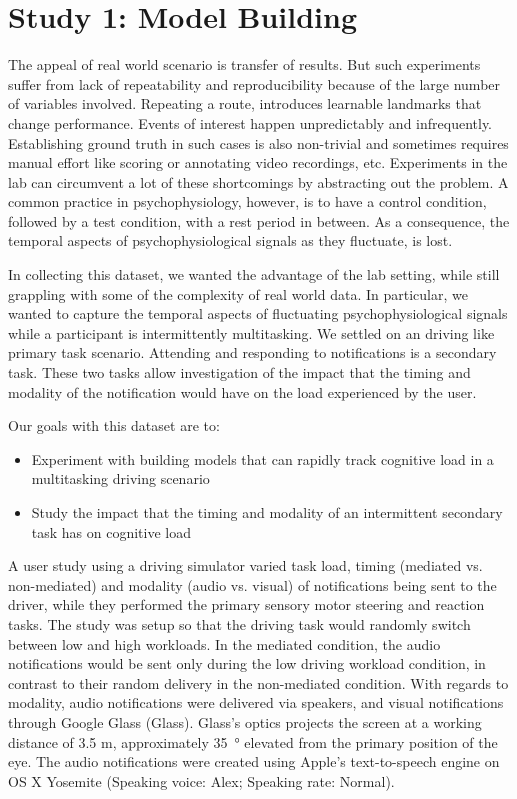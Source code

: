 \section{Study 1: Model Building}
The appeal of real world scenario is transfer of results. But such experiments suffer from lack of repeatability and reproducibility because of the large number of variables involved. Repeating a route, introduces learnable landmarks that change performance.  Events of interest happen unpredictably and infrequently. Establishing ground truth in such cases is also non-trivial and sometimes requires manual effort like scoring or annotating video recordings, etc. Experiments in the lab can circumvent a lot of these shortcomings by abstracting out the problem. A common practice in psychophysiology, however, is to have a control condition, followed by a test condition, with a rest period in between. As a consequence, the temporal aspects of psychophysiological signals as they fluctuate, is lost. 


In collecting this dataset, we wanted the advantage of the lab setting, while still grappling with some of the complexity of real world data. In particular, we wanted to capture the temporal aspects of fluctuating psychophysiological signals while a participant is intermittently multitasking. We settled on an driving like primary task scenario. Attending and responding to notifications is a  secondary task. These two tasks allow investigation of the impact that the timing and modality of the notification would have on the load experienced by the user. 

Our goals with this dataset are to:
\begin{itemize}
\item Experiment with building models that can rapidly track cognitive load in a multitasking driving scenario
\item Study the impact that the timing and modality of an intermittent secondary task has on cognitive load
\end{itemize}

A user study using a driving simulator varied task load,  timing (mediated vs. non-mediated) and modality (audio vs. visual) of notifications being sent to the driver, while they performed the primary sensory motor steering and reaction tasks. The study was setup so that the driving task would randomly switch between low and high workloads. In the mediated condition, the audio notifications would be sent only during the low driving workload condition, in contrast to their random delivery in the non-mediated condition. With regards to modality, audio notifications were delivered via speakers, and visual notifications through Google Glass (Glass). Glass's optics projects the screen at a working distance of 3.5 m, approximately \SI{35}{\degree} elevated from the primary position of the eye. The audio notifications were created using Apple's text-to-speech engine on OS X Yosemite (Speaking voice: Alex; Speaking rate: Normal).



